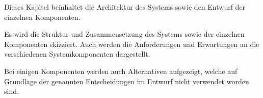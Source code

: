 Dieses Kapitel beinhaltet die Architektur des Systems sowie den Entwurf der einzelnen Komponenten.

Es wird die Struktur und Zusammensetzung des Systems sowie der einzelnen Komponenten skizziert. Auch werden die Anforderungen und Erwartungen an die verschiedenen Systemkomponenten dargestellt.

Bei einigen Komponenten werden auch Alternativen aufgezeigt, welche auf Grundlage der genannten Entscheidungen im Entwurf nicht verwendet worden sind.
